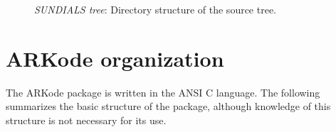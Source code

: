 \documentclass[letterpaper,10pt,english]{sphinxmanual}
\begin{document}
\begin{figure}[htbp]
\centering
\capstart

\caption{\emph{SUNDIALS tree}: Directory structure of the source tree.}\label{Organization:sunorg2}\end{figure}


\section{ARKode organization}
\label{Organization:arkode-organization}
The ARKode package is written in the ANSI C language.  The
following summarizes the basic structure of the package, although
knowledge of this structure is not necessary for its use.
\end{document}
